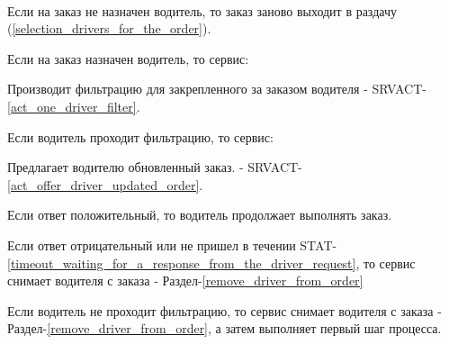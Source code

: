     \begin{alg}\label{edit_order_alg} \mbox{}\\
        \begin{longenum}
          \item Если на заказ не назначен водитель, то заказ заново выходит в раздачу (\ref{selection_drivers_for_the_order}).
          \item Если на заказ назначен водитель, то сервис:
          \begin{longenum}
            \item Производит фильтрацию для закрепленного за заказом водителя - SRVACT-\ref{act_one_driver_filter}.
              \begin{longenum}
                \item Если водитель проходит фильтрацию, то сервис:
                  \begin{longenum}
                   \item Предлагает водителю обновленный заказ. - SRVACT-\ref{act_offer_driver_updated_order}.
                     \begin{longenum}
                      \item Если ответ положительный, то водитель продолжает выполнять заказ.
                      \item Если ответ отрицательный или не пришел в течении STAT-\ref{timeout_waiting_for_a_response_from_the_driver_request}, то сервис снимает водителя с заказа - Раздел-\ref{remove_driver_from_order}
                     \end{longenum}
                  \end{longenum}
                \item Если водитель не проходит фильтрацию, то сервис снимает водителя с заказа - Раздел-\ref{remove_driver_from_order}, а затем выполняет первый шаг процесса.
              \end{longenum}
          \end{longenum}
        \end{longenum}
      \end{alg}